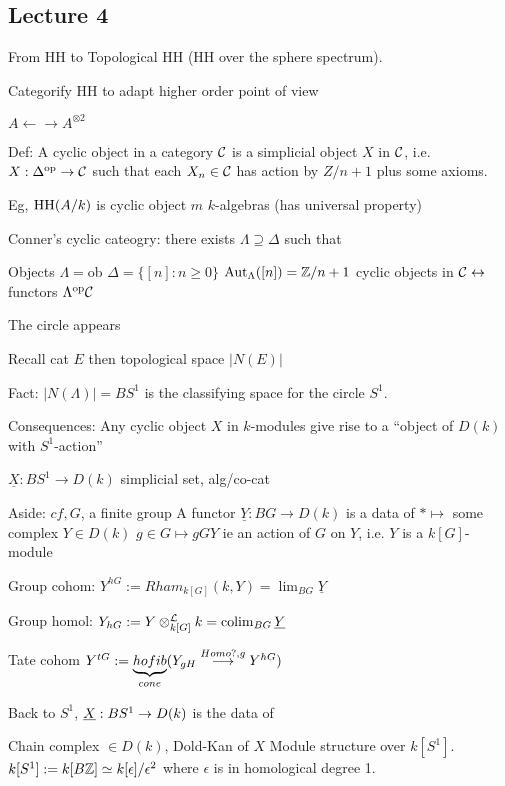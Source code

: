 \newpage
\subsection{Lecture 4}

From HH to Topological HH (HH over the sphere spectrum).

Categorify HH to adapt higher order point of view

$A \leftarrow \rightarrow A^{\otimes 2}$ %


Def: A cyclic object in a category $\mathcal{C}$ is a simplicial object $X$ in $\mathcal{C}$, i.e. $X: \Delta^\text{op} \to \mathcal{C}$ such that each $X_n \in \mathcal{C}$ has action by $Z/n+1$ plus some axioms. 




Eg, $\operatorname{HH}(A/k)$ is cyclic object $m$ $k$-algebras (has universal property)

Conner's cyclic cateogry: there exists $\Lambda \supseteq \Delta$ such that 

Objects $\Lambda= $ob $\Delta=\{[n] \colon n \geq 0\}$
$\operatorname{Aut}_\Lambda([n])= \mathbb{Z}/n+1$
cyclic objects in $\mathcal{C} \leftrightarrow$ functors $\Lambda^{\text{op}} \mathcal{C}$

The circle appears

Recall cat $E$ then topological space $|N(E)|$

Fact: $|N(\Lambda)|= BS^1$ is the classifying space for the circle $S^1$. 

Consequences: Any cyclic object $X$ in $k$-modules give rise to a ``object of $D(k)$ with $S^1$-action''

$\underline{X}: BS^1 \to D(k)$
simplicial set, alg/co-cat

Aside: $cf, G$, a finite group
A functor $\underline{Y}: BG \to D(k)$ is a data of 
$* \mapsto$ some complex $Y \in D(k)$
$g \in G \mapsto gGY$ ie an action of $G$ on $Y$, i.e. $Y$ is a $k[G]$-module

Group cohom: 
$Y^{hG}:= Rham_{k[G]}(k,Y)= \lim_{BG} \underline{Y}$

Group homol:
$Y_{hG}:= Y \otimes_{k[G]}^\mathcal{L} k = \operatorname{colim}_{BG} \underline{Y}$

Tate cohom
$Y^{tG}:= \underbrace{hofib}_{cone}(Y_{gH} \stackrel{Homo ?,g}{\longrightarrow} Y^{hG})$

Back to $S^1$, $\underline{X}: BS^1 \to D(k)$ is the data of 

Chain complex $\in D(k)$, Dold-Kan of $X$
Module structure over $k[S^1]$.
$k[S^1]:= k[B\mathbb{Z}] \simeq k[\epsilon]/\epsilon^2$
where $\epsilon$ is in homological degree 1.

